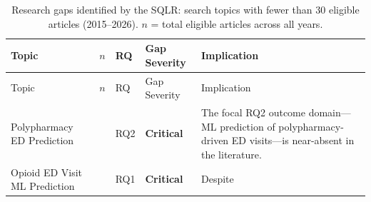 \documentclass[
  12pt,
]{book}
\begin{document}
\begin{longtable}[]{@{}
  >{\raggedright\arraybackslash}p{}
  >{\raggedleft\arraybackslash}p{}
  >{\raggedright\arraybackslash}p{}
  >{\raggedright\arraybackslash}p{}
  >{\raggedright\arraybackslash}p{}@{}}
\caption{Research gaps identified by the SQLR: search topics with fewer
than 30 eligible articles (2015--2026). \(n\) = total eligible articles
across all years.}\label{tbl-gaps}\tabularnewline
\toprule\noalign{}
\begin{minipage}[b]{\linewidth}\raggedright
Topic
\end{minipage} & \begin{minipage}[b]{\linewidth}\raggedleft
\(n\)
\end{minipage} & \begin{minipage}[b]{\linewidth}\raggedright
RQ
\end{minipage} & \begin{minipage}[b]{\linewidth}\raggedright
Gap Severity
\end{minipage} & \begin{minipage}[b]{\linewidth}\raggedright
Implication
\end{minipage} \\
\midrule\noalign{}
\endfirsthead
\toprule\noalign{}
\begin{minipage}[b]{\linewidth}\raggedright
Topic
\end{minipage} & \begin{minipage}[b]{\linewidth}\raggedleft
\(n\)
\end{minipage} & \begin{minipage}[b]{\linewidth}\raggedright
RQ
\end{minipage} & \begin{minipage}[b]{\linewidth}\raggedright
Gap Severity
\end{minipage} & \begin{minipage}[b]{\linewidth}\raggedright
Implication
\end{minipage} \\
\midrule\noalign{}
\endhead
\bottomrule\noalign{}
\endlastfoot
Polypharmacy ED Prediction & 3 & RQ2 & \textbf{Critical} & The focal RQ2
outcome domain---ML prediction of polypharmacy-driven ED visits---is
near-absent in the literature. \\
Opioid ED Visit ML Prediction & 6 & RQ1 & \textbf{Critical} & Despite

\end{longtable}
\end{document}
